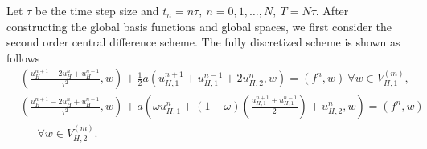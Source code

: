 \documentclass[preprint,12pt]{elsarticle}
\begin{document}
Let $\tau$ be the time step size and $t_n=n\tau,~n=0,1,\dots,N,~T=N\tau.$ After constructing the global basis functions and global spaces, we first consider the second order central difference scheme. The fully discretized scheme is shown as follows
\begin{equation}\label{0.4}
\begin{aligned}
     &\left(\frac{u_{H}^{n+1}-2u_{H}^{n}+u_{H}^{n-1}}{\tau^2},w\right)+\frac{1}{2}a\left(u_{H,1}^{n+1}+u_{H,1}^{n-1}+2u_{H,2}^{n},w\right)=\left(f^n,w\right)~ \forall w \in V_{H,1}^{(m)},\\
     &\left(\frac{u_{H}^{n+1}-2u_{H}^{n}+u_{H}^{n-1}}{\tau^2},w\right)+a\left(\omega u_{H,1}^{n}+(1-\omega)\left(\frac{u_{H,1}^{n+1}+u_{H,1}^{n-1}}{2}\right)+u_{H,2}^{n},w\right)=\left(f^n,w\right)~\\&~~~~~~~\forall w \in V_{H,2}^{(m)}.
\end{aligned}
\end{equation}
\end{document}
